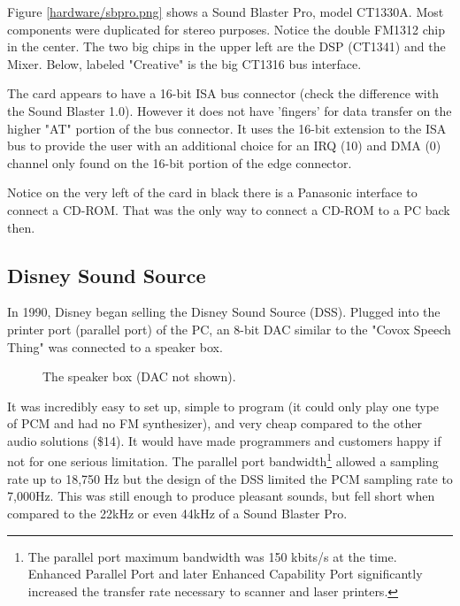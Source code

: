\documentclass[book.tex]{subfiles}
\begin{document}
Figure \ref{hardware/sbpro.png} shows a Sound Blaster Pro, model CT1330A. Most components were duplicated for stereo purposes. Notice the double FM1312 chip in the center. The two big chips in the upper left are the DSP (CT1341) and the Mixer. Below, labeled "Creative" is the big CT1316 bus interface.\\
\par
{} The card appears to have a 16-bit ISA bus connector (check the difference with the Sound Blaster 1.0). However it does not have 'fingers' for data transfer on the higher "AT" portion of the bus connector. It uses the 16-bit extension to the ISA bus to provide the user with an additional choice for an IRQ (10) and DMA (0) channel only found on the 16-bit portion of the edge connector.\\
\par
Notice on the very left of the card in black there is a Panasonic interface to connect a CD-ROM. That was the only way to connect a CD-ROM to a PC back then.


  \subsection{Disney Sound Source}
  In 1990, Disney began selling the Disney Sound Source (DSS). Plugged into the printer port (parallel port) of the PC, an 8-bit DAC similar to the "Covox Speech Thing" was connected to a speaker box. 
  \par
  \begin{figure}[H] 
    \centering 
    \caption{The speaker box (DAC not shown).}
  \end{figure}
\par
It was incredibly easy to set up, simple to program (it could only play one type of PCM and had no FM synthesizer), and very cheap compared to the other audio solutions (\$14). It would have made programmers and customers happy if not for one serious limitation. The parallel port bandwidth\footnote{The parallel port maximum bandwidth was 150 kbits/s at the time. Enhanced Parallel Port and later Enhanced Capability Port significantly increased the transfer rate necessary to scanner and laser printers.} allowed a sampling rate up to 18,750 Hz but the design of the DSS limited the PCM sampling rate to 7,000Hz. This was still enough to produce pleasant sounds, but fell short when compared to the 22kHz or even 44kHz of a Sound Blaster Pro.
\end{document}
